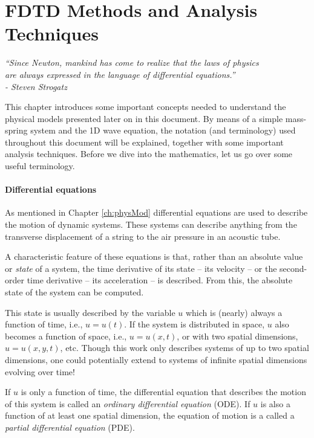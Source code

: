 \chapter{FDTD Methods and Analysis Techniques}\label{ch:FDTD}

\begin{flushright}{\it
``Since Newton, mankind has come to realize that the laws of physics\\
are always expressed in the language of differential equations.''\\
- Steven Strogatz\\
\SWcomment[(https://youtu.be/O85OWBJ2ayo?t=44)]} 
\end{flushright}
%
This chapter introduces some important concepts needed to understand the physical models presented later on in this document. 
By means of a simple mass-spring system and the 1D wave equation, the notation (and terminology) used throughout this document will be explained, together with some important analysis techniques. 
Before we dive into the mathematics, let us go over some useful terminology.

\subsubsection{Differential equations}
As mentioned in Chapter \ref{ch:physMod} differential equations are used to describe the motion of dynamic systems. These systems can describe anything from the transverse displacement of a string to the air pressure in an acoustic tube.

A characteristic feature of these equations is that, rather than an absolute value or \textit{state} of a system, the time derivative of its state -- its velocity -- or the second-order time derivative -- its acceleration -- is described. From this, the absolute state of the system can be computed.

This state is usually described by the variable $u$ which is (nearly) always a function of time, i.e., $u=u(t)$. If the system is distributed in space, $u$ also becomes a function of space, i.e., $u = u(x,t)$, or with two spatial dimensions, $u = u(x,y,t)$, etc. Though this work only describes systems of up to two spatial dimensions, one could potentially extend to systems of infinite spatial dimensions evolving over time! 

If $u$ is only a function of time, the differential equation that describes the motion of this system is called an \textit{ordinary differential equation} (ODE). If $u$ is also a function of at least one spatial dimension, the equation of motion is a called a \textit{partial differential equation} (PDE).

